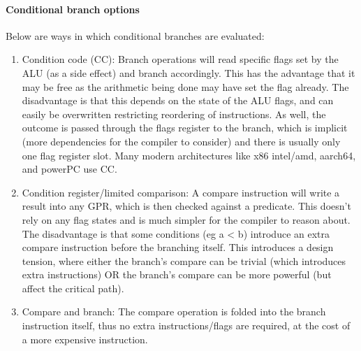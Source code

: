 \paragraph{Conditional branch options}
Below are ways in which conditional branches are evaluated:
\begin{enumerate}
  \item Condition code (CC): Branch operations will read specific flags set by the ALU (as a side effect) and branch accordingly. This has the advantage that it may be free as the arithmetic being done may have set the flag already. The disadvantage is that this depends on the state of the ALU flags, and can easily be overwritten restricting reordering of instructions. As well, the outcome is passed through the flags register to the branch, which is implicit (more dependencies for the compiler to consider) and there is usually only one flag register slot. Many modern architectures like x86 intel/amd, aarch64, and powerPC use CC.
  \item Condition register/limited comparison: A compare instruction will write a result into any GPR, which is then checked against a predicate. This doesn't rely on any flag states and is much simpler for the compiler to reason about. The disadvantage is that some conditions (eg a < b) introduce an extra compare instruction before the branching itself. This introduces a design tension, where either the branch's compare can be trivial (which introduces extra instructions) OR the branch's compare can be more powerful (but affect the critical path).
  \item Compare and branch: The compare operation is folded into the branch instruction itself, thus no extra instructions/flags are required, at the cost of a more expensive instruction.
\end{enumerate}
